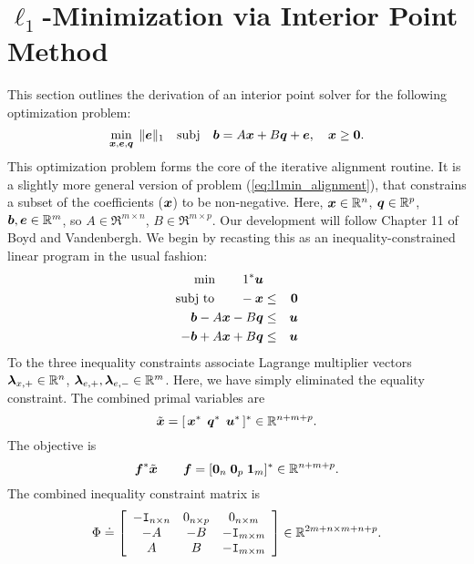 \section{$\ell_1$-Minimization via Interior Point Method}
\label{sec:ipm_derivation}

This section outlines the derivation of an interior point solver for the following optimization problem:
\begin{equation}
\min_{{\boldsymbol{x}},\boldsymbol{e},{\boldsymbol q}}\;  \| \boldsymbol{e} \|_1 \quad \mathrm{subj} \quad \boldsymbol{b} = A {\boldsymbol{x}} + B {\boldsymbol q} + \boldsymbol{e}, \quad {\boldsymbol{x}} \ge \boldsymbol{0}.
\end{equation} This optimization problem forms the core of the iterative alignment routine.
It is a slightly more general version of problem (\ref{eq:l1min_alignment}),
that constrains a subset of the coefficients (${\boldsymbol{x}}$) to be non-negative. 
Here, ${\boldsymbol{x}} \in \mathbb R^n$, ${\boldsymbol q} \in \mathbb R^p$, $\boldsymbol{b}, \boldsymbol{e} \in
\mathbb R^m$, so $A \in \Re^{m \times n}$, $B \in \Re^{m\times p}$. Our development
will follow Chapter 11 of Boyd and Vandenbergh. We begin by recasting this as
an inequality-constrained linear program in the usual fashion:
\begin{eqnarray*}
\min \qquad 1^* \boldsymbol{u} \\
\textup{subj to} \qquad -{\boldsymbol{x}} &\le& \boldsymbol{0} \\
\boldsymbol{b} - A{\boldsymbol{x}} - B{\boldsymbol q} &\le& \boldsymbol{u} \\
-\boldsymbol{b} + A {\boldsymbol{x}} + B{\boldsymbol q} &\le& \boldsymbol{u}
\end{eqnarray*}
To the three inequality constraints associate Lagrange multiplier vectors $\boldsymbol{\lambda}_{x,+} \in \mathbb R^n$, $\boldsymbol{\lambda}_{e,+}, \boldsymbol{\lambda}_{e,-} \in \mathbb R^m$. Here, we have simply eliminated the equality constraint. The combined primal variables are 
\begin{equation}
\tilde {{\boldsymbol{x}}} = [ \, {\boldsymbol{x}}^* \;\, {\boldsymbol q}^* \;\, \boldsymbol{u}^* \, ]^* \in \mathbb R^{n+m+p}.
\end{equation}
The objective is
\begin{equation}
\boldsymbol{f}^* \tilde {{\boldsymbol{x}}} \qquad   \boldsymbol{f} = [ \boldsymbol{0}_n \; \boldsymbol{0}_p \; {\boldsymbol{1}}_m ]^* \in \mathbb R^{n+m+p}.
\end{equation}
The combined inequality constraint matrix is
\begin{equation}
\Phi \doteq \left[ \begin{array}{ccc} 
-\mathtt{I}_{n \times n} & 0_{n \times p} & 0_{n \times m} \\
-A &  -B & - \mathtt{I}_{m \times m} \\
A  &   B  &  - \mathtt{I}_{m \times m} \\
\end{array} \right] \in \mathbb R^{2m + n \times m + n + p}.
\end{equation}
